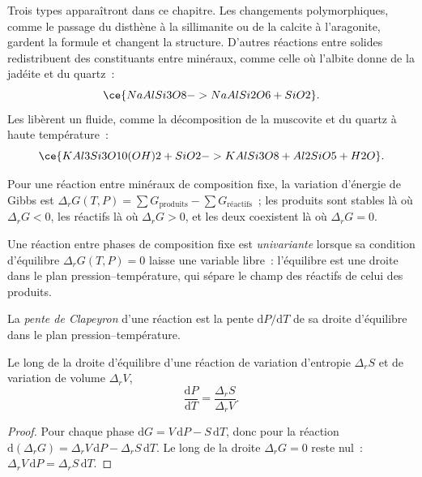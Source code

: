 Trois types apparaîtront dans ce chapitre. Les changements polymorphiques, comme le passage du disthène
à la sillimanite ou de la calcite à l'aragonite, gardent la formule et changent la structure.
D'autres réactions entre solides redistribuent des constituants entre minéraux, comme celle où l'albite
donne de la jadéite et du quartz~:
\[
\ce{NaAlSi3O8 -> NaAlSi2O6 + SiO2}.
\]
Les  libèrent un fluide, comme la décomposition de la muscovite et du quartz
à haute température~:
\[
\ce{KAl3Si3O10(OH)2 + SiO2 -> KAlSi3O8 + Al2SiO5 + H2O}.
\]

Pour une réaction entre minéraux de composition fixe, la variation d'énergie de Gibbs est
$\Delta_r G(T, P) = \sum G_{\text{produits}} - \sum G_{\text{réactifs}}$~; les produits
sont stables là où $\Delta_r G < 0$, les réactifs là où $\Delta_r G > 0$, et les deux
coexistent là où $\Delta_r G = 0$.

\begin{definition}\label{def:b2:metamorphic-facies:univariant}
Une réaction entre phases de composition fixe est \emph{univariante}
lorsque sa condition d'équilibre $\Delta_r G(T, P) = 0$ laisse une variable
libre~: l'équilibre est une droite dans le plan pression--température, qui sépare
le champ des réactifs de celui des produits.
\end{definition}

\begin{definition}\label{def:b2:metamorphic-facies:clapeyron}
La \emph{pente de Clapeyron} d'une réaction est la pente
$\mathrm dP/\mathrm dT$ de sa droite d'équilibre dans le plan pression--température.
\end{definition}

\begin{proposition}\label{prop:b2:metamorphic-facies:clapeyron}
Le long de la droite d'équilibre d'une réaction de variation d'entropie $\Delta_r S$ et de variation
de volume $\Delta_r V$,
\[
\frac{\mathrm dP}{\mathrm dT} = \frac{\Delta_r S}{\Delta_r V}.
\]
\end{proposition}

\begin{proof}
Pour chaque phase $\mathrm dG = V\,\mathrm dP - S\,\mathrm dT$, donc pour la réaction
$\mathrm d(\Delta_r G) = \Delta_r V\,\mathrm dP - \Delta_r S\,\mathrm dT$. Le long de la droite
$\Delta_r G = 0$ reste nul~: $\Delta_r V\,\mathrm dP = \Delta_r S\,\mathrm dT$.
\end{proof}

